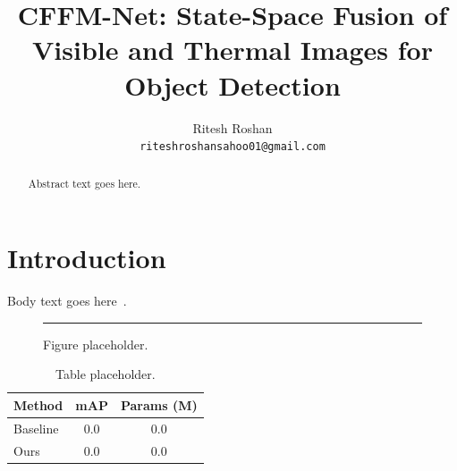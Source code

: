 \documentclass[11pt]{article}
\title{CFFM-Net: State-Space Fusion of Visible and Thermal Images for Object Detection}
\author{Ritesh Roshan\\
\texttt{riteshroshansahoo01@gmail.com}}
\date{}
\begin{document}
\maketitle

\begin{abstract}
Abstract text goes here.
\end{abstract}

\section{Introduction}
\label{sec:intro}
Body text goes here~\cite{gu2023mamba}.

\begin{figure}[t]
  \centering
  \rule{0.8\linewidth}{4cm}
  \caption{Figure placeholder.}
  \label{fig:placeholder}
\end{figure}

\begin{table}[t]
  \centering
  \begin{tabular}{lcc}
    \toprule
    Method & mAP & Params (M) \\
    \midrule
    Baseline & 0.0 & 0.0 \\
    Ours & 0.0 & 0.0 \\
    \bottomrule
  \end{tabular}
  \caption{Table placeholder.}
  \label{tab:placeholder}
\end{table}



\end{document}

